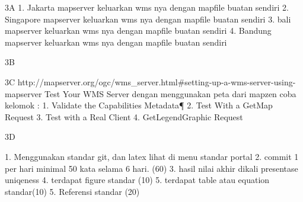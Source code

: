 3A
1. Jakarta mapserver keluarkan wms nya dengan mapfile buatan sendiri
2. Singapore mapserver keluarkan wms nya dengan mapfile buatan sendiri
3. bali mapserver keluarkan wms nya dengan mapfile buatan sendiri
4. Bandung mapserver keluarkan wms nya dengan mapfile buatan sendiri

3B



3C
http://mapserver.org/ogc/wms_server.html#setting-up-a-wms-server-using-mapserver
Test Your WMS Server dengan menggunakan peta dari mapzen coba
kelomok :
1. Validate the Capabilities Metadata¶
2. Test With a GetMap Request
3. Test with a Real Client
4. GetLegendGraphic Request

3D




1. Menggunakan standar git, dan latex lihat di menu standar portal
2. commit 1 per hari minimal 50 kata selama 6 hari. (60)
3. hasil nilai akhir dikali presentase uniqeness
4. terdapat figure standar (10)
5. terdapat table atau equation standar(10)
5. Referensi standar (20)
